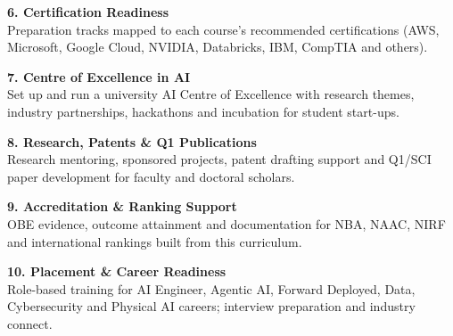 \documentclass[10pt,a4paper]{article}
\begin{document}
\begin{tcbraster}[raster columns=2,raster equal height=rows,raster column skip=8pt,raster row skip=6pt]
\begin{tcolorbox}[colback=white,colframe=igreen!60,boxrule=0.6pt,arc=2pt,left=5pt,right=5pt,top=3pt,bottom=3pt,borderline north={2.5pt}{0pt}{igreen}]{\small\bfseries\color{navy}6. Certification Readiness}\\[1pt]{\footnotesize Preparation tracks mapped to each course's recommended certifications (AWS, Microsoft, Google Cloud, NVIDIA, Databricks, IBM, CompTIA and others).}\end{tcolorbox}
\begin{tcolorbox}[colback=white,colframe=saffron!60,boxrule=0.6pt,arc=2pt,left=5pt,right=5pt,top=3pt,bottom=3pt,borderline north={2.5pt}{0pt}{saffron}]{\small\bfseries\color{navy}7. Centre of Excellence in AI}\\[1pt]{\footnotesize Set up and run a university AI Centre of Excellence with research themes, industry partnerships, hackathons and incubation for student start-ups.}\end{tcolorbox}
\begin{tcolorbox}[colback=white,colframe=chakra!60,boxrule=0.6pt,arc=2pt,left=5pt,right=5pt,top=3pt,bottom=3pt,borderline north={2.5pt}{0pt}{chakra}]{\small\bfseries\color{navy}8. Research, Patents \& Q1 Publications}\\[1pt]{\footnotesize Research mentoring, sponsored projects, patent drafting support and Q1/SCI paper development for faculty and doctoral scholars.}\end{tcolorbox}
\begin{tcolorbox}[colback=white,colframe=igreen!60,boxrule=0.6pt,arc=2pt,left=5pt,right=5pt,top=3pt,bottom=3pt,borderline north={2.5pt}{0pt}{igreen}]{\small\bfseries\color{navy}9. Accreditation \& Ranking Support}\\[1pt]{\footnotesize OBE evidence, outcome attainment and documentation for NBA, NAAC, NIRF and international rankings built from this curriculum.}\end{tcolorbox}
\begin{tcolorbox}[colback=white,colframe=saffron!60,boxrule=0.6pt,arc=2pt,left=5pt,right=5pt,top=3pt,bottom=3pt,borderline north={2.5pt}{0pt}{saffron}]{\small\bfseries\color{navy}10. Placement \& Career Readiness}\\[1pt]{\footnotesize Role-based training for AI Engineer, Agentic AI, Forward Deployed, Data, Cybersecurity and Physical AI careers; interview preparation and industry connect.}\end{tcolorbox}
\end{tcbraster}
\end{document}
